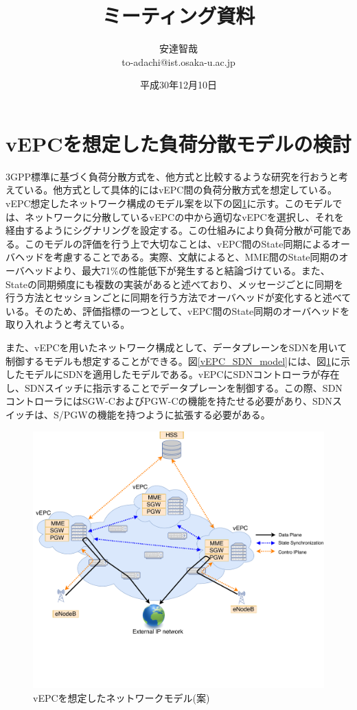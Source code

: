 \documentclass[a4j]{ujarticle}
\title{ミーティング資料}
\author{安達智哉\\to-adachi@ist.osaka-u.ac.jp}
\date{平成30年12月10日}
\begin{document}
\maketitle

\section{vEPCを想定した負荷分散モデルの検討}
3GPP標準に基づく負荷分散方式を、他方式と比較するような研究を行おうと考えている。他方式として具体的にはvEPC間の負荷分散方式を想定している。vEPC想定したネットワーク構成のモデル案を以下の図\ref{vEPC_model}に示す。このモデルでは、ネットワークに分散しているvEPCの中から適切なvEPCを選択し、それを経由するようにシグナリングを設定する。この仕組みにより負荷分散が可能である。このモデルの評価を行う上で大切なことは、vEPC間のState同期によるオーバヘッドを考慮することである。実際、文献\cite{PerformanceComparisonofStateSynchronizationTechniquesinaDistributedLTEEPC}によると、MME間のState同期のオーバヘッドより、最大71\%の性能低下が発生すると結論づけている。また、Stateの同期頻度にも複数の実装があると述べており、メッセージごとに同期を行う方法とセッションごとに同期を行う方法でオーバヘッドが変化すると述べている。そのため、評価指標の一つとして、vEPC間のState同期のオーバヘッドを取り入れようと考えている。


また、vEPCを用いたネットワーク構成として、データプレーンをSDNを用いて制御するモデルも想定することができる。図\ref{vEPC_SDN_model}には、図\ref{vEPC_model}に示したモデルにSDNを適用したモデルである。vEPCにSDNコントローラが存在し、SDNスイッチに指示することでデータプレーンを制御する。この際、SDNコントローラにはSGW-CおよびPGW-Cの機能を持たせる必要があり、SDNスイッチは、S/PGWの機能を持つように拡張する必要がある。
\begin{figure}[htbp]
	\centering
	\includegraphics[width=0.7\hsize]{vEPC_model.pdf}
  \caption{vEPCを想定したネットワークモデル(案)}
	\label{vEPC_model}
\end{figure}
\end{document}
